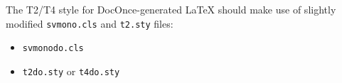 \documentclass[graybox,sectrefs,envcountresetchap,open=right,final]{svmonodo}
\makeatletter
\def\cleardoublepage{\clearpage\if@twoside \ifodd\c@page\else
\hbox{}
\thispagestyle{empty}
\newpage
\if@twocolumn\hbox{}\newpage\fi\fi\fi}
\makeatother
\begin{document}
The T2/T4 style for DocOnce-generated {\LaTeX} should make use of
slightly modified \texttt{svmono.cls} and \texttt{t2.sty} files:

\begin{itemize}
 \item \texttt{svmonodo.cls}

 \item \texttt{t2do.sty} or \texttt{t4do.sty}
\end{itemize}

\noindent
\clearemptydoublepage
{}
\thispagestyle{empty}





\cleardoublepage{}  %
\printindex
\end{document}
